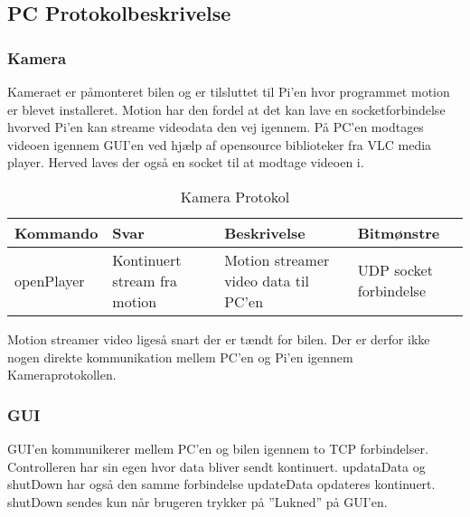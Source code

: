 \subsection{PC Protokolbeskrivelse}

\subsubsection{Kamera}

Kameraet er påmonteret bilen og er tilsluttet til Pi'en hvor programmet motion er blevet installeret. Motion har den fordel at det kan lave en socketforbindelse hvorved Pi’en kan streame videodata den vej igennem. På PC'en modtages videoen igennem GUI'en ved hjælp af opensource biblioteker fra VLC media player. Herved laves der også en socket til at modtage videoen i.

\begin{table}[h]
\begin{tabularx}{\textwidth}{| Z | Z | Z | Z |} \hline

\textbf{Kommando} 						&
\textbf{Svar}							&
\textbf{Beskrivelse}					&
\textbf{Bitmønstre}						\\ \hline

openPlayer								&
Kontinuert stream fra motion			&
Motion streamer video data til PC'en	&
UDP socket forbindelse					\\ \hline

\end{tabularx}
\caption{Kamera Protokol}
\label{tbl:prt_cam}
\end{table}

Motion streamer video ligeså snart der er tændt for bilen. Der er derfor ikke nogen direkte kommunikation mellem PC'en og Pi'en igennem Kameraprotokollen.


\subsubsection{GUI}

GUI'en kommunikerer mellem PC'en og bilen igennem to TCP forbindelser. Controlleren har sin egen hvor data bliver sendt kontinuert. updataData og shutDown har også den samme forbindelse updateData opdateres kontinuert. shutDown sendes kun når brugeren trykker på ''Lukned'' på GUI'en. 

